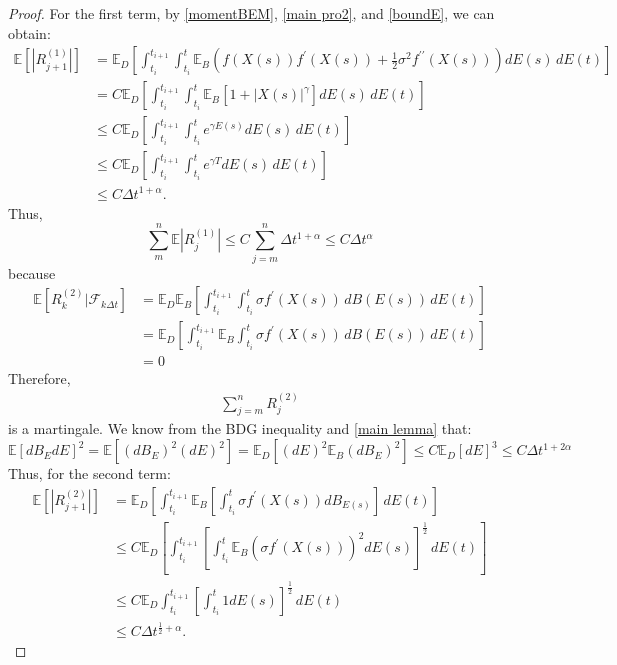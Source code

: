 \documentclass[10pt,reqno,final]{amsart}
\theoremstyle{plain}
\theoremstyle{definition}
\theoremstyle{remark}
\numberwithin{equation}{section}
\numberwithin{figure}{section}
\numberwithin{table}{section}
\begin{document}
\begin{proof}
	For the first term, by \cref{momentBEM}, \cref{main pro2}, and \cref{boundE}, we can obtain:
	\begin{align*}
		\mathbb{E} \left[ |R_{j+1}^{(1)}| \right] 
		&= \mathbb{E}_D \left[
		\int_{t_i}^{t_{i+1}} \int_{t_i}^{t}  \mathbb{E}_B \left( f(X(s)) f^{\prime}(X(s)) + \frac{1}{2} \sigma^2 f^{\prime\prime}(X(s)) \right) dE(s) \, dE(t)
		\right] \\
		&= C \mathbb{E}_D \left[
		\int_{t_i}^{t_{i+1}} \int_{t_i}^{t}  \mathbb{E}_B \left[ 1 + |X(s)|^{\gamma} \right] dE(s) \, dE(t)
		\right] \\
		&\le C \mathbb{E}_D \left[
		\int_{t_i}^{t_{i+1}} \int_{t_i}^{t}  e^{\gamma E(s)} dE(s) \, dE(t)
		\right] \\
		&\le C \mathbb{E}_D \left[
		\int_{t_i}^{t_{i+1}} \int_{t_i}^{t}  e^{\gamma T} dE(s) \, dE(t)
		\right] \\
		&\le C \Delta t^{1+\alpha}.
	\end{align*}
	Thus,
	\begin{equation}
		\sum_{m}^{n} \mathbb{E} \left| R_{j}^{(1)} \right| \leq C \sum_{j=m}^{n} \Delta t^{1+\alpha} \le C \Delta t^\alpha
	\end{equation}
	because
	\begin{align*}
		\mathbb{E} \left[ R_{k}^{(2)} | \mathcal{F}_{k\Delta t} \right] 
		&= \mathbb{E}_D \mathbb{E}_B \left[ \int_{t_i}^{t_{i+1}} \int_{t_i}^{t} \sigma f^{\prime}(X(s)) \, dB(E(s)) \, dE(t) \right] \\
		&= \mathbb{E}_D \left[ \int_{t_i}^{t_{i+1}} \mathbb{E}_B \int_{t_i}^{t} \sigma f^{\prime}(X(s)) \, dB(E(s)) \, dE(t) \right] \\
		&= 0
	\end{align*}
	Therefore,
	\begin{align*}
		\sum_{j=m}^{n} R_{j}^{(2)} 
	\end{align*}
	is a martingale. We know from the BDG inequality and \cref{main lemma} that:
	\begin{equation*}
		\mathbb{E} [dB_E dE]^2 = \mathbb{E} [(dB_E)^2 (dE)^2] = \mathbb{E}_D [(dE)^2 \mathbb{E}_B (dB_E)^2] \leq C \mathbb{E}_D [dE]^3 \leq C \Delta t^{1 + 2\alpha}
	\end{equation*}
	Thus, for the second term:
	\begin{align*}
		\mathbb{E} \left[ |R_{j+1}^{(2)}| \right] 
		&= \mathbb{E}_D \left[
		\int_{t_i}^{t_{i+1}} \mathbb{E}_B  \left[ \int_{t_i}^{t}  \sigma f^{\prime}(X(s)) dB_{E(s)} \right] \, dE(t)
		\right] \\
		&\le C \mathbb{E}_D \left[
		\int_{t_i}^{t_{i+1}} \left[ \int_{t_i}^{t}  \mathbb{E}_B \left( \sigma f^{\prime}(X(s)) \right)^2 dE(s) \right]^{\frac{1}{2}} \, dE(t)
		\right] \\
		&\le C \mathbb{E}_D 
		\int_{t_i}^{t_{i+1}} \left[ \int_{t_i}^{t}  1 dE(s) \right]^{\frac{1}{2}} \, dE(t) \\
		&\le C \Delta t^{\frac{1}{2} + \alpha}.
	\end{align*}
	

\end{proof}
\end{document}
